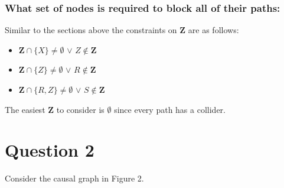 \documentclass{article}
\begin{document}
\subsubsection{What set of nodes is required to block all of their paths:}
Similar to the sections above the constraints on $\mathbf{Z}$ are as follows:
\begin{itemize}
    \item $\mathbf{Z} \cap \{X\} \neq \emptyset$ $\lor$ $Z \notin \mathbf{Z}$
    \item $\mathbf{Z} \cap \{Z\} \neq \emptyset$ $\lor$ $R \notin \mathbf{Z}$
    \item $\mathbf{Z} \cap \{R,Z\} \neq \emptyset$ $\lor$ $S \notin \mathbf{Z}$
    \end{itemize}
The easiest $\mathbf{Z}$ to consider is $\emptyset{}$ since every path has a collider.

\newpage
\section*{Question 2}
Consider the causal graph in Figure 2.
\end{document}
